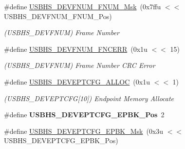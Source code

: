 \begin{DoxyCompactItemize}
\item 
\mbox{\label{group__SAMS70__USBHS_gab99a382c8e0f0a7fe07ff224d0e1bd68}} 
\#define \mbox{\hyperlink{group__SAMS70__USBHS_gab99a382c8e0f0a7fe07ff224d0e1bd68}{U\+S\+B\+H\+S\+\_\+\+D\+E\+V\+F\+N\+U\+M\+\_\+\+F\+N\+U\+M\+\_\+\+Msk}}~(0x7ffu $<$$<$ U\+S\+B\+H\+S\+\_\+\+D\+E\+V\+F\+N\+U\+M\+\_\+\+F\+N\+U\+M\+\_\+\+Pos)
\begin{DoxyCompactList}\small\item\em (U\+S\+B\+H\+S\+\_\+\+D\+E\+V\+F\+N\+UM) Frame Number \end{DoxyCompactList}\item 
\mbox{\label{group__SAMS70__USBHS_ga4df9554cc274588bae10e6e109461aa3}} 
\#define \mbox{\hyperlink{group__SAMS70__USBHS_ga4df9554cc274588bae10e6e109461aa3}{U\+S\+B\+H\+S\+\_\+\+D\+E\+V\+F\+N\+U\+M\+\_\+\+F\+N\+C\+E\+RR}}~(0x1u $<$$<$ 15)
\begin{DoxyCompactList}\small\item\em (U\+S\+B\+H\+S\+\_\+\+D\+E\+V\+F\+N\+UM) Frame Number C\+RC Error \end{DoxyCompactList}\item 
\mbox{\label{group__SAMS70__USBHS_gaca800bdf4e2d323dcf1455b8c6b77941}} 
\#define \mbox{\hyperlink{group__SAMS70__USBHS_gaca800bdf4e2d323dcf1455b8c6b77941}{U\+S\+B\+H\+S\+\_\+\+D\+E\+V\+E\+P\+T\+C\+F\+G\+\_\+\+A\+L\+L\+OC}}~(0x1u $<$$<$ 1)
\begin{DoxyCompactList}\small\item\em (U\+S\+B\+H\+S\+\_\+\+D\+E\+V\+E\+P\+T\+C\+FG\mbox{[}10\mbox{]}) Endpoint Memory Allocate \end{DoxyCompactList}\item 
\mbox{\label{group__SAMS70__USBHS_ga9c204c7785eb0c1f229018919cdd962d}} 
\#define {\bfseries U\+S\+B\+H\+S\+\_\+\+D\+E\+V\+E\+P\+T\+C\+F\+G\+\_\+\+E\+P\+B\+K\+\_\+\+Pos}~2
\item 
\mbox{\label{group__SAMS70__USBHS_ga21ff629a9b5ae6ea0e8255180ca92df3}} 
\#define \mbox{\hyperlink{group__SAMS70__USBHS_ga21ff629a9b5ae6ea0e8255180ca92df3}{U\+S\+B\+H\+S\+\_\+\+D\+E\+V\+E\+P\+T\+C\+F\+G\+\_\+\+E\+P\+B\+K\+\_\+\+Msk}}~(0x3u $<$$<$ U\+S\+B\+H\+S\+\_\+\+D\+E\+V\+E\+P\+T\+C\+F\+G\+\_\+\+E\+P\+B\+K\+\_\+\+Pos)

\end{DoxyCompactItemize}
